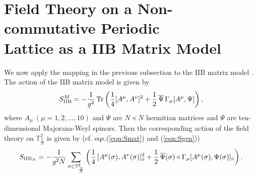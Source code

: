 \documentclass[12pt,a4paper]{article}
\newcommand{\ncpl}{{\mathbb T}^2_\frac{2}{N}}
\newcommand{\Tr}{\mbox{\rm Tr}}
\begin{document}
\section{Field Theory on a Non-commutative Periodic\\
Lattice as a IIB Matrix Model}\label{sec:FNIIB}
We now apply the mapping in the previous subsection to the IIB matrix
model \cite{IKKT}. The action of the IIB matrix model \cite{IKKT}
is given by
\begin{equation}
    S^M_{\mbox{\scriptsize IIB}}=
	-{\frac{1}{g^2}}\,\Tr\left({\frac{1}{4}}[A^\mu,A^\nu]^2
	+{\frac{1}{2}}\,{\overline\Psi}\,\Gamma_\mu[A^\mu,\Psi]\right),
\label{eqn:SikktOrg}
\end{equation}
where $A_{\mu}~(\mu = 1,2,\dots,10)$ and $\Psi$ are $N\times N$
hermitian matrices and $\Psi$ are ten-dimensional Majorana-Weyl
spinors.
Then the corresponding action of the field theory on $\ncpl$ is
given by (cf. eqs.(\ref{eqn:Smat}) and (\ref{eqn:Sgen}))
\cite{tokyou,landi}
\begin{equation}
  S_{\mbox{\scriptsize IIB}_N}=-{\frac{1}{g^2N}}\sum_{\sigma\in\ncpl}
	\left({\frac{1}{4}}\,[A^\mu(\sigma),A^\nu(\sigma)]_\diamond^2
	+{\frac{1}{2}}\,{\overline\Psi}(\sigma)\diamond\Gamma_\mu
	[A^\mu(\sigma),\Psi(\sigma)]_\diamond\right)\label{eqn:SikktNCT}.
\end{equation}
\end{document}
